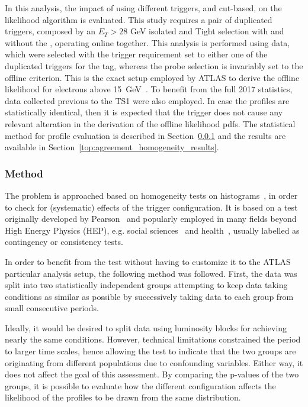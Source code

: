 In this 
analysis, the impact of using different triggers, \rnn{} and cut-based, on the likelihood algorithm is evaluated. This study requires a pair of duplicated triggers, composed by an $E_T > 28$ GeV isolated and Tight selection with and without the \rnn{}, operating online together. 
This analysis is performed using \Zee{} \tnp{} data, which were selected with the trigger requirement set to either one of the duplicated triggers for the tag, whereas the probe selection is invariably set to the offline \vloose{} criterion. This is the exact setup employed by ATLAS to derive the offline likelihood for electrons above \SI{15}{\GeV}~\cite{aaboud2019electron}. To benefit from the full 2017 statistics, data collected previous to the TS1 were also employed. In case the profiles are statistically identical, then it is expected that the \rnn{} trigger does not cause any relevant alteration in the derivation of the offline likelihood pdfs.  The statistical method for profile evaluation is described in Section~\ref{top:homogeneity_method} and the results are available in Section~\ref{top:agreement_homogeneity_results}.




\subsubsection{Method}\label{top:homogeneity_method}



The problem is approached based on homogeneity tests on histograms~\cite{homogeneity_test}, in order to check for (systematic) effects of the trigger configuration. It is based on a test originally developed by Pearson~\cite{pearson1911probability} and popularly employed in many fields beyond High Energy Physics (HEP), e.g. social sciences~\cite{wickens2014multiway} and health~\cite{ma2015homogeneity}, usually labelled as contingency or consistency tests.

In order to benefit from the test without having to customize it to the ATLAS particular analysis setup, the following method was followed. First, the data was split into two
statistically independent groups attempting to keep data taking conditions as
similar as possible by successively taking data to each group from small
consecutive periods.

Ideally, it would be desired to split data using luminosity
blocks for achieving nearly the same conditions. However, technical limitations
constrained the period to larger time scales, hence allowing the test to
indicate that the two groups are originating from different populations due to
confounding variables. Either way, it does not affect the goal of this assessment. 
By comparing the p-values of the two groups, it is possible to evaluate how the different configuration affects the likelihood of the profiles to be drawn from the same distribution. 


